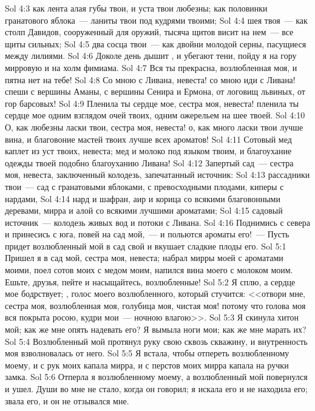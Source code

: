 \vs Sol 4:3 как лента алая губы твои, и уста твои любезны; как половинки гранатового яблока~--- ланиты твои под кудрями твоими;
\vs Sol 4:4 шея твоя~--- как столп Давидов, сооруженный для оружий, тысяча щитов висит на нем~--- все щиты сильных;
\vs Sol 4:5 два сосца твои~--- как двойни молодой серны, пасущиеся между лилиями.
\vs Sol 4:6 Доколе день дышит , и убегают тени, пойду я на гору мирровую и на холм фимиама.
\rsbpar\vs Sol 4:7 Вся ты прекрасна, возлюбленная моя, и пятна нет на тебе!
\vs Sol 4:8 Со мною с Ливана, невеста! со мною иди с Ливана! спеши с вершины Аманы, с вершины Сенира и Ермона, от логовищ львиных, от гор барсовых!
\vs Sol 4:9 Пленила ты сердце мое, сестра моя, невеста! пленила ты сердце мое одним взглядом очей твоих, одним ожерельем на шее твоей.
\vs Sol 4:10 О, как любезны ласки твои, сестра моя, невеста! о, как много ласки твои лучше вина, и благовоние мастей твоих лучше всех ароматов!
\vs Sol 4:11 Сотовый мед каплет из уст твоих, невеста; мед и молоко под языком твоим, и благоухание одежды твоей подобно благоуханию Ливана!
\vs Sol 4:12 Запертый сад~--- сестра моя, невеста, заключенный колодезь, запечатанный источник:
\vs Sol 4:13 рассадники твои~--- сад с гранатовыми яблоками, с превосходными плодами, киперы с нардами,
\vs Sol 4:14 нард и шафран, аир и корица со всякими благовонными деревами, мирра и алой со всякими лучшими ароматами;
\vs Sol 4:15 садовый источник~--- колодезь живых вод и потоки с Ливана.
\vs Sol 4:16 Поднимись  с севера и принесись с юга, повей на сад мой,~--- и польются ароматы его!~--- Пусть придет возлюбленный мой в сад свой и вкушает сладкие плоды его.
\vs Sol 5:1 Пришел я в сад мой, сестра моя, невеста; набрал мирры моей с ароматами моими, поел сотов моих с медом моим, напился вина моего с молоком моим. Ешьте, друзья, пейте и насыщайтесь, возлюбленные!
\rsbpar\vs Sol 5:2 Я сплю, а сердце мое бодрствует; , голос моего возлюбленного, который стучится: <<отвори мне, сестра моя, возлюбленная моя, голубица моя, чистая моя! потому что голова моя вся покрыта росою, кудри мои~--- ночною влагою>>.
\vs Sol 5:3 Я скинула хитон мой; как же мне опять надевать его? Я вымыла ноги мои; как же мне марать их?
\vs Sol 5:4 Возлюбленный мой протянул руку свою сквозь скважину, и внутренность моя взволновалась от него.
\vs Sol 5:5 Я встала, чтобы отпереть возлюбленному моему, и с рук моих капала мирра, и с перстов моих мирра капала на ручки замка.
\vs Sol 5:6 Отперла я возлюбленному моему, а возлюбленный мой повернулся и ушел. Души во мне не стало, когда он говорил; я искала его и не находила его; звала его, и он не отзывался мне.
